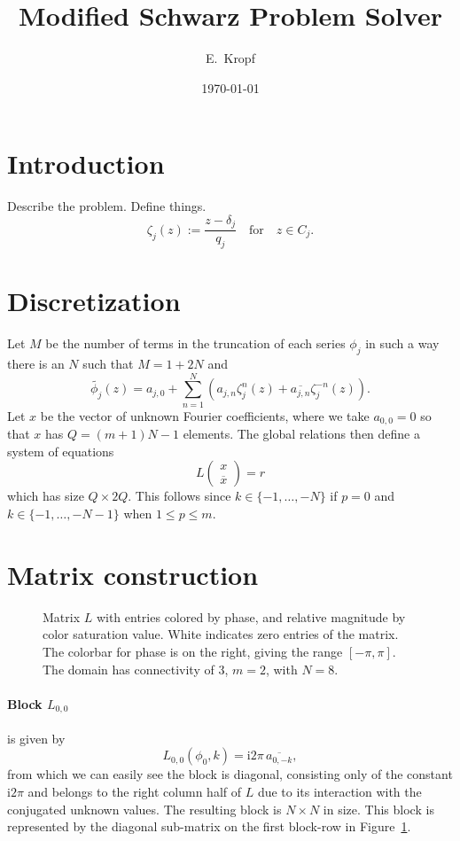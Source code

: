 \documentclass[12pt,a4paper,fleqn]{article}
\title{Modified Schwarz Problem Solver}
\author{E.~Kropf}
\date{\today}
\newcommand{\conj}[1]{\overline{#1}}
\renewcommand{\i}{\mathrm{i}}
\begin{document}
\maketitle

\section{Introduction}
Describe the problem. Define things.
\begin{equation}
  \zeta_j(z) := \frac{z - \delta_j}{q_j} \quad \text{for} \quad z\in C_j.
\end{equation}

\section{Discretization}
Let $M$ be the number of terms in the truncation of each series $\phi_j$ in such a way there is an $N$ such that $M = 1 + 2N$ and
\begin{equation}
\tilde{\phi_j}(z) = a_{j,0} + \sum_{n=1}^N \left( a_{j,n} \zeta_j^n(z) + \conj{a_{j,n}} \zeta_j^{-n}(z) \right).
  \label{eq:discrete_uknown}
\end{equation}
Let $x$ be the vector of unknown Fourier coefficients, where we take $a_{0,0} = 0$ so that $x$ has $Q = (m+1)N - 1$ elements. The global relations then define a system of equations
\begin{equation}
  L
  \begin{pmatrix}
    x \\
    \conj{x}
  \end{pmatrix}
  = r
  \label{eq:base_linear_system}
\end{equation}
which has size $Q\times 2Q$. This follows since $k\in\{-1,\dots,-N\}$ if $p = 0$ and $k\in\{-1,\dots,-N-1\}$ when $1\le p\le m$.

\section{Matrix construction}
\begin{figure}[htbp]
  \centering
  \caption{Matrix $L$ with entries colored by phase, and relative magnitude by color saturation value. White indicates zero entries of the matrix. The colorbar for phase is on the right, giving the range $[-\pi,\pi]$. The domain has connectivity of 3, $m = 2$, with $N = 8$.}
  \label{fig:L_matrix}
\end{figure}

\paragraph{Block $L_{0,0}$} is given by
\begin{equation}
  L_{0,0}(\phi_0,k) = \i2\pi \,\conj{a_{0,-k}},
  \label{eq:block_L00}
\end{equation}
from which we can easily see the block is diagonal, consisting only of the constant $\i2\pi$ and belongs to the right column half of $L$ due to its interaction with the conjugated unknown values. The resulting block is $N\times N$ in size. This block is represented by the diagonal sub-matrix on the first block-row in Figure~\ref{fig:L_matrix}.
\end{document}
